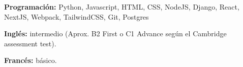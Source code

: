

\begin{cvpubs}

  \cvpub
    {
      \begin{cvlist}
        \item{\textbf{Programación:} Python, Javascript, HTML, CSS, NodeJS, Django, React, NextJS, Webpack, TailwindCSS, Git, Postgres }
        \item{\textbf{Inglés:} intermedio (Aprox. B2 First o C1 Advance según el Cambridge assessment test). }
        \item{\textbf{Francés:} básico. }
      \end{cvlist}
    }\vspace{-4pt}
\end{cvpubs}